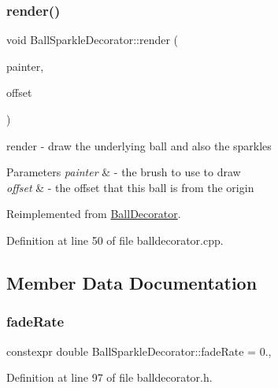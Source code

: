 \subsubsection{\texorpdfstring{render()}{render()}}
{\footnotesize\ttfamily void Ball\+Sparkle\+Decorator\+::render (\begin{DoxyParamCaption}\item[{Q\+Painter \&}]{painter,  }\item[{const Q\+Vector2D \&}]{offset }\end{DoxyParamCaption})\hspace{0.3cm}{\ttfamily [virtual]}}



render -\/ draw the underlying ball and also the sparkles 


\begin{DoxyParams}{Parameters}
{\em painter} & -\/ the brush to use to draw \\
\hline
{\em offset} & -\/ the offset that this ball is from the origin \\
\hline
\end{DoxyParams}


Reimplemented from \mbox{\hyperlink{class_ball_decorator_af8205f8033b2490ecd3365c24ff5cdeb}{Ball\+Decorator}}.



Definition at line 50 of file balldecorator.\+cpp.



\subsection{Member Data Documentation}
\mbox{\label{class_ball_sparkle_decorator_ad4e98ec20a12be0c8b0481879d4c2d17}} 
\subsubsection{\texorpdfstring{fade\+Rate}{fadeRate}}
{\footnotesize\ttfamily constexpr double Ball\+Sparkle\+Decorator\+::fade\+Rate = 0.\hspace{0.3cm}{\ttfamily [static]}, {\ttfamily [protected]}}



Definition at line 97 of file balldecorator.\+h.

